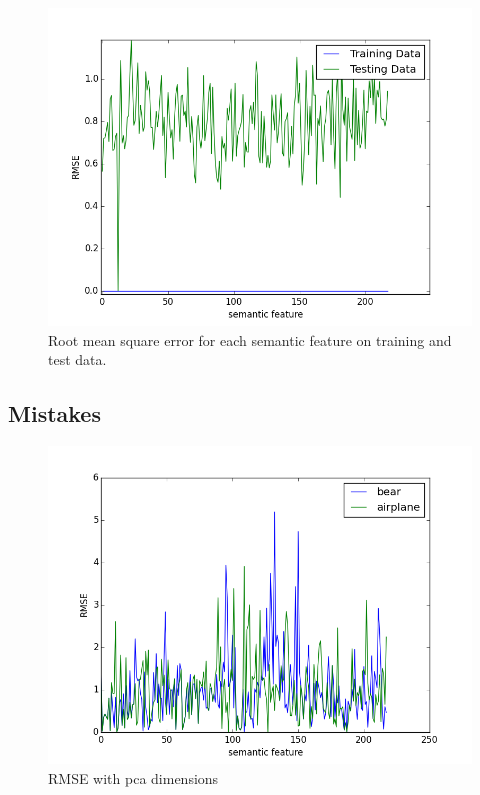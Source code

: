 \documentclass{article} %
\begin{document}
\begin{figure}[h]
\begin{center}
\includegraphics[scale=0.5]{rmse_train_test.png}
\end{center}
\caption{Root mean square error for each semantic feature on training and test data.}
\end{figure}






\subsection{Mistakes}


\begin{figure}[h]
\begin{center}
\includegraphics[scale=0.5]{mistaken_word0.png}
\end{center}
\caption{RMSE with pca dimensions}
\end{figure}
\end{document}
